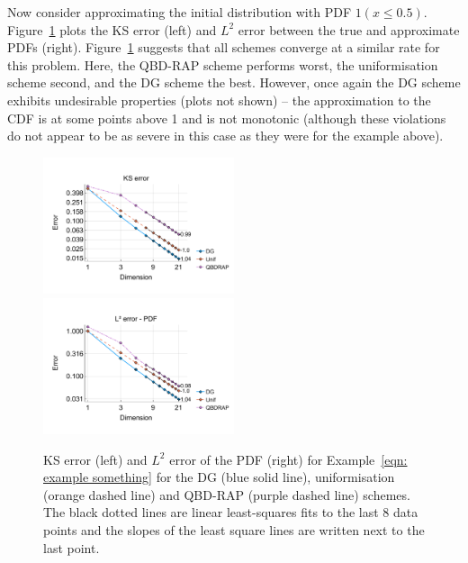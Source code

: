 \begin{example}\label{eqn: example something}
	Now consider approximating the initial distribution with PDF \(1(x\leq 0.5)\). Figure~\ref{fig: fun 2 comp} plots the KS error (left) and \(L^2\) error between the true and approximate PDFs (right). Figure~\ref{fig: fun 2 comp} suggests that all schemes converge at a similar rate for this problem. Here, the QBD-RAP scheme performs worst, the uniformisation scheme second, and the DG scheme the best. However, once again the DG scheme exhibits undesirable properties (plots not shown) -- the approximation to the CDF is at some points above 1 and is not monotonic (although these violations do not appear to be as severe in this case as they were for the example above). 
\begin{figure}[h]
	\centering
	\includegraphics[width=0.5\textwidth,trim={0.5cm 0.8cm 0.2cm 1.25cm},clip]{chapter6/figs/comp/fun2/meshs_ks_error_formatted.pdf}%
	\includegraphics[width=0.5\textwidth,trim={0.5cm 0.8cm 0.2cm 1.25cm},clip]{chapter6/figs/comp/fun2/meshs_l2_pdf_error_formatted.pdf}
	\caption{KS error (left) and \(L^2\) error of the PDF (right) for Example~\ref{eqn: example something} for the DG (blue solid line), uniformisation (orange dashed line) and QBD-RAP (purple dashed line) schemes. The black dotted lines are linear least-squares fits to the last 8 data points and the slopes of the least square lines are written next to the last point.}
	\label{fig: fun 2 comp} 
\end{figure}
\exampleFloatBarrier
\end{example}

